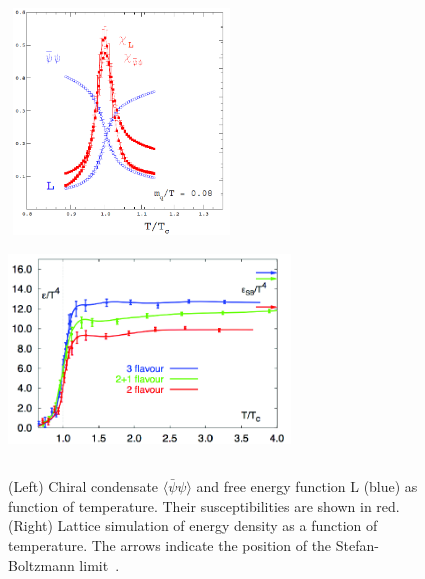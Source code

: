 \begin{figure}[!t]
\label{fig:Lattice}
\includegraphics[width=6cm,height=6cm]{FigCap1/Lattice1.png} 
\includegraphics[width=7.5cm,height=5.8cm]{FigCap1/Lattice2.png}
 \caption{(Left) Chiral condensate $\langle \bar{\psi}\psi\rangle$ and free energy function L (blue) as function of temperature. Their susceptibilities are shown in red. (Right) Lattice simulation of energy density as a function of temperature. The arrows indicate the position of the Stefan-Boltzmann limit~\cite{Karsch:2001vs}.}
\end{figure}

